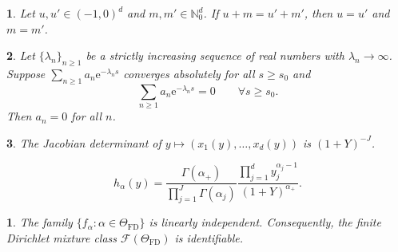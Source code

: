 \documentclass[10pt,a4paper]{amsart}
\newtheorem{lem}{}
\newtheorem{thm}{}
\begin{document}
\begin{lem}
\label{lem:disjoint} Let $u,u'\in(-1,0)^{d}$ and $m,m'\in\mathbb{N}_{0}^{d}$.
If $u+m=u'+m'$, then $u=u'$ and $m=m'$. 
\end{lem}

\begin{lem}
\label{lem:dirichlet_series} Let $\{\lambda_{n}\}_{n\ge1}$ be a
strictly increasing sequence of real numbers with $\lambda_{n}\to\infty$.
Suppose $\sum_{n\ge1}a_{n}\mathrm{e}^{-\lambda_{n}s}$ converges absolutely
for all $s\ge s_{0}$ and 
\[
\sum_{n\ge1}a_{n}\mathrm{e}^{-\lambda_{n}s}=0\qquad\forall s\ge s_{0}.
\]
Then $a_{n}=0$ for all $n$. 
\end{lem}

\begin{lem}
\label{lem:chart_jac} The Jacobian determinant of $y\mapsto(x_{1}(y),\dots,x_{d}(y))$
is $(1+Y)^{-J}$. 
\end{lem}

\begin{equation}
h_{\alpha}(y)=\frac{\Gamma(\alpha_{+})}{\prod_{j=1}^{J}\Gamma(\alpha_{j})}\frac{\prod_{j=1}^{d}y_{j}^{\alpha_{j}-1}}{(1+Y)^{\alpha_{+}}}.\label{eq:transported_kernel}
\end{equation}

\begin{thm}
\label{thm:linind_FD} The family $\{f_{\alpha}:\alpha\in\Theta_{\mathrm{FD}}\}$
is linearly independent. Consequently, the finite Dirichlet mixture
class $\mathcal{F}\left(\Theta_{\mathrm{FD}}\right)$ is identifiable. 
\end{thm}
\end{document}
